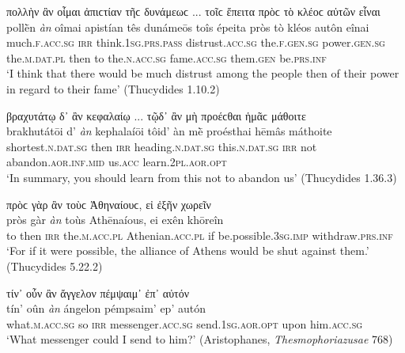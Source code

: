 \begin{exe}
\ex πολλὴν ἂν οἶμαι ἀπιϲτίαν τῆϲ δυνάμεωϲ ... τοῖϲ ἔπειτα πρὸϲ τὸ κλέοϲ αὐτῶν εἶναι\\
\gll pollḕn \emph{àn} oîmai apistían tês dunámeōs toîs épeita pròs tò kléos autôn eînai\\
much.\textsc{f.acc.sg} \textsc{irr} think.\textsc{1sg.prs.pass} distrust.\textsc{acc.sg} the.\textsc{f.gen.sg} power.\textsc{gen.sg} the.\textsc{m.dat.pl} then to the.\textsc{n.acc.sg} fame.\textsc{acc.sg} them.\textsc{gen} be.\textsc{prs.inf}\\
\trans `I think that there would be much distrust among the people then of their power in regard to their fame' (Thucydides 1.10.2)
\label{wordgroup17}
\end{exe}

\begin{exe}
\ex βραχυτάτῳ δ᾽ ἂν κεφαλαίῳ ... τῷδ᾽ ἂν μὴ προέϲθαι ἡμᾶϲ μάθοιτε\\
\gll brakhutátōi d' \emph{àn} kephalaíōi tôid' àn mḕ proésthai hēmâs máthoite\\
shortest.\textsc{n.dat.sg} then \textsc{irr} heading.\textsc{n.dat.sg} this.\textsc{n.dat.sg} \textsc{irr} not abandon.\textsc{aor.inf.mid} us.\textsc{acc} learn.\textsc{2pl.aor.opt}\\
\trans `In summary, you should learn from this not to abandon us' (Thucydides 1.36.3)
\label{wordgroup18}
\end{exe}

\begin{exe}
\ex πρὸϲ γὰρ ἂν τοὺϲ Ἀθηναίουϲ, εἰ ἐξῆν χωρεῖν\\
\gll pròs gàr \emph{àn} toùs Athēnaíous, ei exên khōreîn\\
to then \textsc{irr} the.\textsc{m.acc.pl} Athenian.\textsc{acc.pl} if be.possible.\textsc{3sg.imp} withdraw.\textsc{prs.inf}\\
\trans `For if it were possible, the alliance of Athens would be shut against them.' (Thucydides 5.22.2)
\label{wordgroup19}
\end{exe}

\begin{exe}
\ex τίν᾽ οὖν ἂν ἄγγελον πέμψαιμ᾽ ἐπ᾽ αὐτόν\\
\gll tín' oûn \emph{àn} ángelon pémpsaim' ep' autón\\
what.\textsc{m.acc.sg} so \textsc{irr} messenger.\textsc{acc.sg} send.\textsc{1sg.aor.opt} upon him.\textsc{acc.sg}\\
\trans `What messenger could I send to him?' (Aristophanes, \textit{Thesmophoriazusae} 768)
\label{wordgroup20}
\end{exe}

